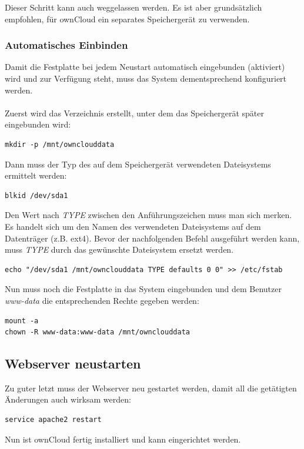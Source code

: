 Dieser Schritt kann auch weggelassen werden. Es ist aber grundsätzlich empfohlen, für ownCloud ein separates Speichergerät zu verwenden.

\subsubsection{Automatisches Einbinden}
Damit die Festplatte bei jedem Neustart automatisch eingebunden (aktiviert) wird und zur Verfügung steht, muss das System dementsprechend konfiguriert werden. 
\\
\\
Zuerst wird das Verzeichnis erstellt, unter dem das Speichergerät später eingebunden wird:

\begin{lstlisting}
mkdir -p /mnt/ownclouddata
\end{lstlisting}

Dann muss der Typ des auf dem Speichergerät verwendeten Dateisystems ermittelt werden:

\begin{lstlisting}
blkid /dev/sda1
\end{lstlisting}

Den Wert nach \textit{TYPE} zwischen den Anführungszeichen muss man sich merken. Es handelt sich um den Namen des verwendeten Dateisystems auf dem Datenträger (z.B. ext4).
Bevor der nachfolgenden Befehl ausgeführt werden kann, muss \textit{TYPE} durch das gewünschte Dateisystem ersetzt werden.

\begin{lstlisting}
echo "/dev/sda1 /mnt/ownclouddata TYPE defaults 0 0" >> /etc/fstab
\end{lstlisting}

Nun muss noch die Festplatte in das System eingebunden und dem Benutzer \textit{www-data} die entsprechenden Rechte gegeben werden:

\begin{lstlisting}
mount -a
chown -R www-data:www-data /mnt/ownclouddata
\end{lstlisting}

\subsection{Webserver neustarten}
Zu guter letzt muss der Webserver neu gestartet werden, damit all die getätigten Änderungen auch wirksam werden:

\begin{lstlisting}
service apache2 restart
\end{lstlisting}

Nun ist ownCloud fertig installiert und kann eingerichtet werden.